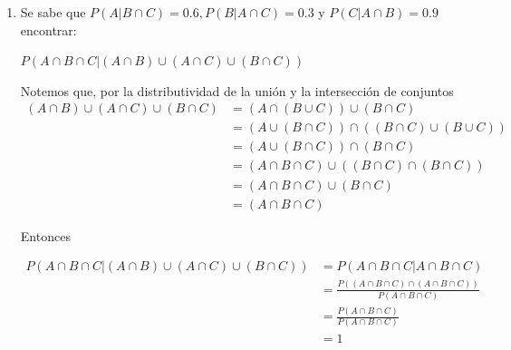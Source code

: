 \documentclass[12pt,a4paper]{report}
\begin{document}
\begin{enumerate}
{\begin{enumerate}[label=\alph*) ]
		 \item{
		 	Se sabe que $P(A|B\cap C)=0.6, P(B|A\cap C)=0.3$ y $P(C|A\cap B)=0.9$ encontrar: \\
		 	\begin{center}
		 	$P(A\cap B\cap C| (A\cap B) \cup (A\cap C) \cup (B\cap C))$
		 	\end{center}
			Notemos que, por la distributividad de la unión y la intersección de conjuntos
			\begin{align*}
				(A\cap B) \cup (A\cap C) \cup (B\cap C) &= (A \cap (B \cup C)) \cup (B \cap C)\\
				 																				&= (A \cup (B \cap C)) \cap ((B \cap C) \cup (B \cup C))\\
																								&= (A \cup (B \cap C)) \cap (B \cap C)\\
																								&= (A \cap B \cap C) \cup ((B \cap C) \cap (B \cap C))\\
																								&= (A \cap B \cap C) \cup (B \cap C)\\
																								&= (A \cap B \cap C)
			\end{align*}

			Entonces

			\begin{align*}
				P(A\cap B\cap C| (A\cap B) \cup (A\cap C) \cup (B\cap C)) &= P(A\cap B\cap C | A\cap B\cap C)\\
																																	&= \frac{P((A\cap B\cap C) \cap (A\cap B\cap C))}{P(A\cap B\cap C)}\\
																																	&= \frac{P(A\cap B\cap C)}{P(A\cap B\cap C)}\\
																																	&= 1
			\end{align*}
		 }
		 \end{enumerate}
  }



\end{enumerate}
\end{document}
